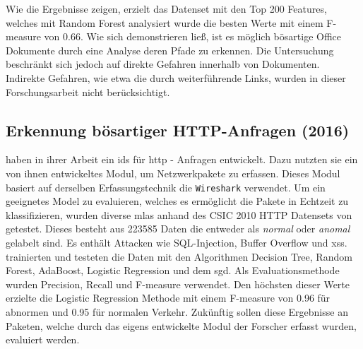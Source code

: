 \documentclass[
    12pt, %
    DIV10,
    ngerman, %
    a4paper, %
    oneside, %
    titlepage, %
    parskip=half, %
    headings=normal, %
    listof=totoc, %
    bibliography=totoc, %
    index=totoc, %
    captions=tableheading, %
    final %
]{scrreprt}
\begin{document}
Wie die Ergebnisse zeigen, erzielt das Datenset mit den Top 200 Features, welches mit Random Forest analysiert wurde die besten Werte mit einem F-measure von 0.66.
Wie sich demonstrieren lie{\ss}, ist es möglich bösartige Office Dokumente durch eine Analyse deren Pfade zu erkennen. 
Die Untersuchung beschränkt sich jedoch auf direkte Gefahren innerhalb von Dokumenten. Indirekte Gefahren, wie etwa die durch weiterführende Links, wurden in dieser Forschungsarbeit nicht berücksichtigt.
\subsection{Erkennung bösartiger HTTP-Anfragen (2016)}\label{csic}
\textcite{Pham2016} haben in ihrer Arbeit ein \ac{ids} für \ac{http} - Anfragen entwickelt. Dazu nutzten sie ein von ihnen entwickeltes Modul, um Netzwerkpakete zu erfassen. Dieses Modul basiert auf derselben Erfassungstechnik die \texttt{Wireshark} verwendet. Um ein geeignetes Model zu evaluieren, welches es ermöglicht die Pakete in Echtzeit zu klassifizieren, wurden diverse \ac{mlas} anhand des CSIC 2010 HTTP Datensets von \textcite{csic} getestet. Dieses besteht aus 223585 Daten die entweder als \emph{normal} oder \emph{anomal} gelabelt sind. Es enthält Attacken wie SQL-Injection, Buffer Overflow und \ac{xss}. \textcite{Pham2016} trainierten und testeten die Daten mit den Algorithmen Decision Tree, Random Forest, AdaBoost, Logistic Regression und dem  \ac{sgd}. Als Evaluationsmethode wurden Precision, Recall und F-measure verwendet. Den höchsten dieser Werte erzielte die Logistic Regression Methode mit einem F-measure von 0.96 für abnormen und 0.95 für normalen Verkehr. Zukünftig sollen diese Ergebnisse an Paketen, welche durch das eigens entwickelte Modul der Forscher erfasst wurden, evaluiert werden.
%
\end{document}
